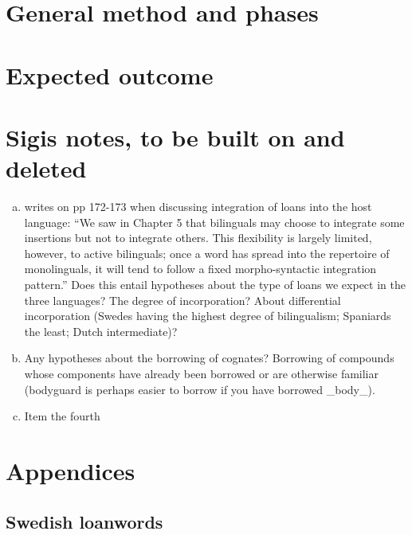 \documentclass[a4paper]{article}
\begin{document}


\section{General method and phases}




\section{Expected outcome}



\section{Sigis notes, to be built on and deleted}


\begin{enumerate}[a.]
	\item \cite{Matras2009} writes on pp 172-173 when discussing integration of loans into the host language: ``We saw in Chapter 5 that bilinguals may choose to integrate some insertions but not to integrate others. This flexibility is largely limited, however, to active bilinguals; once a word has spread into the repertoire of monolinguals, it will tend to follow a fixed morpho-syntactic integration pattern.'' Does this entail hypotheses about the type of loans we expect in the three languages? The degree of incorporation? About differential incorporation (Swedes having the highest degree of bilingualism; Spaniards the least; Dutch intermediate)?
	\item  Any hypotheses about the borrowing of cognates? Borrowing of compounds whose components have already been borrowed or are otherwise familiar (bodyguard is perhaps easier to borrow if you have borrowed _body_). 
	\item  Item the fourth
\end{enumerate}

\section{Appendices}


\subsection{Swedish loanwords}


\end{document}
